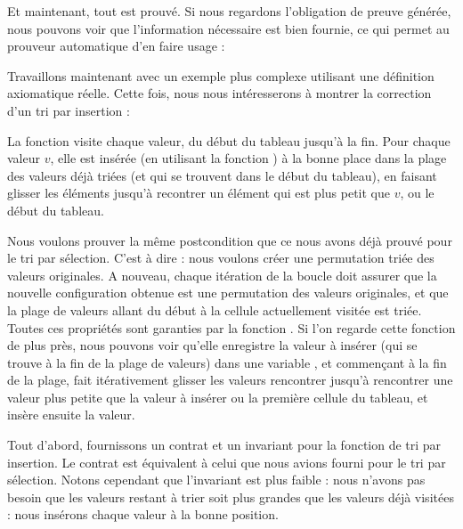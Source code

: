 


Et maintenant, tout est prouvé. Si nous regardons l'obligation de preuve générée,
nous pouvons voir que l'information nécessaire est bien fournie, ce qui permet
au prouveur automatique d'en faire usage :






Travaillons maintenant avec un exemple plus complexe utilisant une définition
axiomatique réelle. Cette fois, nous nous intéresserons à montrer la correction
d'un tri par insertion :




La fonction  visite chaque valeur, du début du tableau
jusqu'à la fin. Pour chaque valeur $v$, elle est insérée (en utilisant la fonction
) à la bonne place dans la plage des valeurs déjà triées (et qui
se trouvent dans le début du tableau), en faisant glisser les éléments jusqu'à
recontrer un élément qui est plus petit que $v$, ou le début du tableau.



Nous voulons prouver la même postcondition que ce nous avons déjà prouvé pour le
tri par sélection. C'est à dire : nous voulons créer une permutation triée des
valeurs originales. A nouveau, chaque itération de la boucle doit assurer que la
nouvelle configuration obtenue est une permutation des valeurs originales, et que
la plage de valeurs allant du début à la cellule actuellement visitée est triée.
Toutes ces propriétés sont garanties par la fonction . Si l'on
regarde cette fonction de plus près, nous pouvons voir qu'elle enregistre la
valeur à insérer (qui se trouve à la fin de la plage de valeurs) dans une variable
, et commençant à la fin de la plage, fait itérativement glisser
les valeurs rencontrer jusqu'à rencontrer une valeur plus petite que la valeur à
insérer ou la première cellule du tableau, et insère ensuite la valeur.




Tout d'abord, fournissons un contrat et un invariant pour la fonction de tri
par insertion. Le contrat est équivalent à celui que nous avions fourni pour le
tri par sélection. Notons cependant que l'invariant est plus faible : nous
n'avons pas besoin que les valeurs restant à trier soit plus grandes que les
valeurs déjà visitées : nous insérons chaque valeur à la bonne position.



